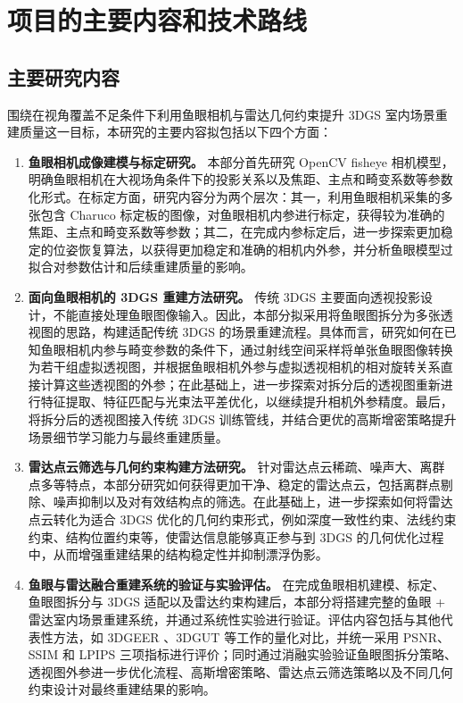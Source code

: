\section{项目的主要内容和技术路线}

\subsection{主要研究内容}

围绕在视角覆盖不足条件下利用鱼眼相机与雷达几何约束提升 3DGS 室内场景重建质量这一目标，本研究的主要内容拟包括以下四个方面：

\begin{enumerate}
    \item \textbf{鱼眼相机成像建模与标定研究。} 本部分首先研究 OpenCV fisheye 相机模型，明确鱼眼相机在大视场角条件下的投影关系以及焦距、主点和畸变系数等参数化形式。在标定方面，研究内容分为两个层次：其一，利用鱼眼相机采集的多张包含 Charuco 标定板的图像，对鱼眼相机内参进行标定，获得较为准确的焦距、主点和畸变系数等参数；其二，在完成内参标定后，进一步探索更加稳定的位姿恢复算法，以获得更加稳定和准确的相机内外参，并分析鱼眼模型过拟合对参数估计和后续重建质量的影响。
    
    \item \textbf{面向鱼眼相机的 3DGS 重建方法研究。} 传统 3DGS 主要面向透视投影设计，不能直接处理鱼眼图像输入。因此，本部分拟采用将鱼眼图拆分为多张透视图的思路，构建适配传统 3DGS 的场景重建流程。具体而言，研究如何在已知鱼眼相机内参与畸变参数的条件下，通过射线空间采样将单张鱼眼图像转换为若干组虚拟透视图，并根据鱼眼相机外参与虚拟透视相机的相对旋转关系直接计算这些透视图的外参；在此基础上，进一步探索对拆分后的透视图重新进行特征提取、特征匹配与光束法平差优化，以继续提升相机外参精度。最后，将拆分后的透视图接入传统 3DGS 训练管线，并结合更优的高斯增密策略提升场景细节学习能力与最终重建质量。
    
    \item \textbf{雷达点云筛选与几何约束构建方法研究。} 针对雷达点云稀疏、噪声大、离群点多等特点，本部分研究如何获得更加干净、稳定的雷达点云，包括离群点剔除、噪声抑制以及对有效结构点的筛选。在此基础上，进一步探索如何将雷达点云转化为适合 3DGS 优化的几何约束形式，例如深度一致性约束、法线约束约束、结构位置约束等，使雷达信息能够真正参与到 3DGS 的几何优化过程中，从而增强重建结果的结构稳定性并抑制漂浮伪影。
    
    \item \textbf{鱼眼与雷达融合重建系统的验证与实验评估。} 在完成鱼眼相机建模、标定、鱼眼图拆分与 3DGS 适配以及雷达约束构建后，本部分将搭建完整的鱼眼 + 雷达室内场景重建系统，并通过系统性实验进行验证。评估内容包括与其他代表性方法，如 3DGEER \cite{huang20253dgeer}、3DGUT \cite{wu20253dgut} 等工作的量化对比，并统一采用 PSNR、SSIM 和 LPIPS 三项指标进行评价；同时通过消融实验验证鱼眼图拆分策略、透视图外参进一步优化流程、高斯增密策略、雷达点云筛选策略以及不同几何约束设计对最终重建结果的影响。
\end{enumerate}

